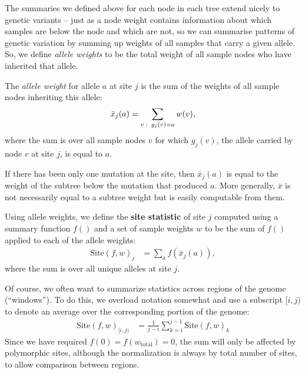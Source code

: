 \documentclass{article}
\newcommand{\site}{\mbox{Site}} %
\newcommand{\iw}{w} %
\newcommand{\tiw}{w_\text{total}} %
\newcommand{\aw}{{\bar x}} %
\begin{document}
The summaries we defined above for each node in each tree
extend nicely to genetic variants 
-- just as a node weight contains information about which samples are below the node and which are not,
so we can summarise patterns of genetic variation by summing up weights of all samples
that carry a given allele.
So, we define \emph{allele weights} to be
the total weight of all sample nodes who have inherited that allele.

\begin{definition}
    The \emph{allele weight} for allele $a$ at site $j$ is the sum of the weights
    of all sample nodes inheriting this allele:
    \begin{align*}
        \aw_j(a) = \sum_{v \st g_j(v) = a} \iw(v) ,
    \end{align*}
    where the sum is over all sample nodes $v$ for which
    $g_j(v)$, the allele carried by node $v$ at site $j$, is equal to $a$.
\end{definition}

If there has been only one mutation at the site,
then $\aw_j(a)$ is equal to the weight of the subtree below the mutation that produced $a$.
More generally, $\aw$ is not necessarily equal to a subtree weight
but is easily computable from them.

Using allele weights,
we define the \textbf{site statistic} of site $j$ computed using a summary function $f()$
and a set of sample weights $\iw$
to be the sum of $f()$ applied to each of the allele weights:
\begin{align}
    \site(f, \iw)_j
    &=
    \sum_{a} f(\aw_j(a)) ,
\end{align}
where the sum is over all unique alleles at site $j$.

Of course, we often want to summarize statistics across regions of the genome (``windows'').
To do this, we overload notation somewhat and use a subscript $[i,j)$ to denote an average
over the corresponding portion of the genome:
\begin{align}
    \site(f, \iw)_{[i,j)}
    &=
    \frac{1}{j-i} \sum_{k=i}^{j-1} \site(f, \iw)_k
\end{align}
Since we have required $f(0) = f(\tiw) = 0$,
the sum will only be affected by polymorphic sites,
although the normalization is always by total number of sites, to allow comparison between regions.
\end{document}
